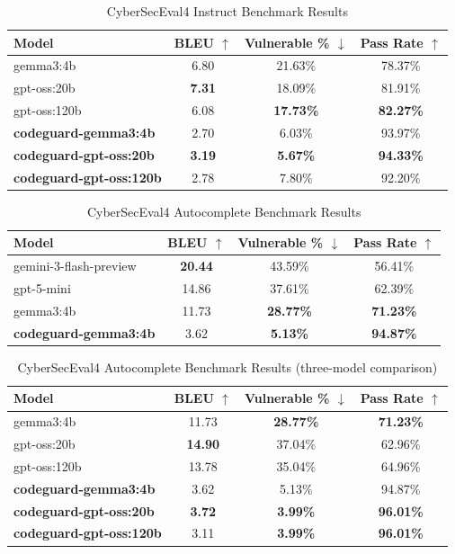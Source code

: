 \begin{table}[h]
\centering
\begin{tabular}{|l|c|c|c|}
\hline
\textbf{Model} & \textbf{BLEU} $\uparrow$ & \textbf{Vulnerable \%} $\downarrow$ & \textbf{Pass Rate} $\uparrow$ \\
\hline
gemma3:4b & 6.80 & 21.63\% & 78.37\% \\
gpt-oss:20b & \textbf{7.31} & 18.09\% & 81.91\% \\
gpt-oss:120b & 6.08 & \textbf{17.73\%} & \textbf{82.27\%} \\
\hline
\textbf{codeguard-gemma3:4b} & 2.70 & 6.03\% & 93.97\% \\
\textbf{codeguard-gpt-oss:20b} & \textbf{3.19} & \textbf{5.67\%} & \textbf{94.33\%} \\
\textbf{codeguard-gpt-oss:120b} & 2.78 & 7.80\% & 92.20\% \\
\hline
\end{tabular}
\caption{CyberSecEval4 Instruct Benchmark Results}
\label{tab:instruct_benchmark}
\end{table}

\begin{table}[h]
\centering
\begin{tabular}{|l|c|c|c|}
\hline
\textbf{Model} & \textbf{BLEU} $\uparrow$ & \textbf{Vulnerable \%} $\downarrow$ & \textbf{Pass Rate} $\uparrow$ \\
\hline
gemini-3-flash-preview & \textbf{20.44} & 43.59\% & 56.41\% \\
gpt-5-mini & 14.86 & 37.61\% & 62.39\% \\
gemma3:4b & 11.73 & \textbf{28.77\%} & \textbf{71.23\%} \\
\hline
\textbf{codeguard-gemma3:4b} & 3.62 & \textbf{5.13\%} & \textbf{94.87\%} \\
\hline
\end{tabular}
\caption{CyberSecEval4 Autocomplete Benchmark Results}
\label{tab:autocomplete_benchmark}
\end{table}

\begin{table}[h]
\centering
\begin{tabular}{|l|c|c|c|}
\hline
\textbf{Model} & \textbf{BLEU} $\uparrow$ & \textbf{Vulnerable \%} $\downarrow$ & \textbf{Pass Rate} $\uparrow$ \\
\hline
gemma3:4b & 11.73 & \textbf{28.77\%} & \textbf{71.23\%} \\
gpt-oss:20b & \textbf{14.90} & 37.04\% & 62.96\% \\
gpt-oss:120b & 13.78 & 35.04\% & 64.96\% \\
\hline
\textbf{codeguard-gemma3:4b} & 3.62 & 5.13\% & 94.87\% \\
\textbf{codeguard-gpt-oss:20b} & \textbf{3.72} & \textbf{3.99\%} & \textbf{96.01\%} \\
\textbf{codeguard-gpt-oss:120b} & 3.11 & \textbf{3.99\%} & \textbf{96.01\%} \\
\hline
\end{tabular}
\caption{CyberSecEval4 Autocomplete Benchmark Results (three-model comparison)}
\label{tab:autocomplete_benchmark_three_models}
\end{table}
